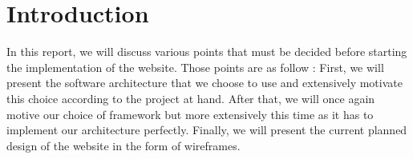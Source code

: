 
\section{Introduction}


In this report, we will discuss various points that must be decided before
starting the implementation of the website. Those points are as follow :
First, we will present the software architecture that we choose to use and
extensively motivate this choice according to the project at hand. After
that, we will once again motive our choice of framework but more
extensively this time as it has to implement our architecture perfectly.
Finally, we will present the current planned design of the website in the
form of wireframes.
